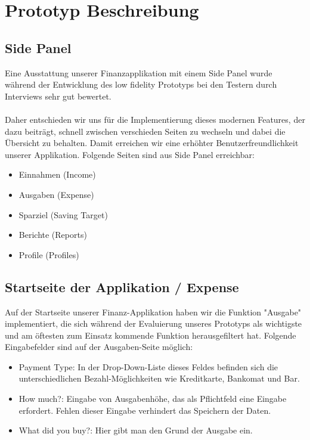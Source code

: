 \documentclass[runningheads,a4paper]{llncs}
\begin{document}
\section{Prototyp Beschreibung}
\subsection{Side Panel}
Eine Ausstattung unserer Finanzapplikation mit einem Side Panel wurde  während der Entwicklung des low fidelity Prototyps bei den Testern durch Interviews sehr gut bewertet.\\\\Daher entschieden wir uns für die Implementierung dieses modernen Features, der dazu beiträgt, schnell zwischen verschieden Seiten zu wechseln und dabei die Übersicht zu behalten.
Damit erreichen wir eine erhöhter Benutzerfreundlichkeit unserer Applikation. Folgende Seiten sind aus Side Panel erreichbar:

\begin{itemize}
\item Einnahmen (Income)
\item Ausgaben (Expense)
\item Sparziel (Saving Target)
\item Berichte (Reports)
\item Profile (Profiles)
\end {itemize}



\subsection{Startseite der Applikation / Expense}

Auf der Startseite unserer Finanz-Applikation haben wir die Funktion "Ausgabe" implementiert, die sich während der Evaluierung unseres Prototyps als wichtigste und am öftesten zum Einsatz kommende Funktion herausgefiltert hat. 
Folgende Eingabefelder sind auf der Ausgaben-Seite möglich: 

\begin{itemize}
\item Payment Type: In der Drop-Down-Liste dieses Feldes befinden sich die unterschiedlichen Bezahl-Möglichkeiten wie Kreditkarte, Bankomat und Bar.\\
\item How much?: Eingabe von Ausgabenhöhe, das als Pflichtfeld eine Eingabe erfordert. Fehlen dieser Eingabe verhindert das Speichern der Daten. \\
\item What did you buy?: Hier gibt man den Grund der Ausgabe ein.\\
\end {itemize}
\end{document}
